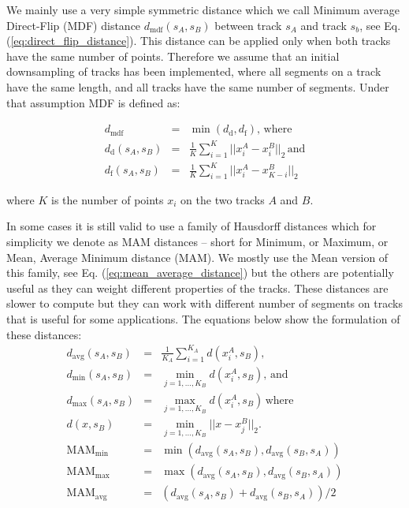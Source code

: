 \documentclass[preprint,authoryear,a4paper,10pt,onecolumn]{elsarticle}
\begin{document}
We mainly use a very simple symmetric distance \citep{EGMB10,
  Visser2010} which we call Minimum average Direct-Flip (MDF) distance
$d_{\textrm{mdf}}(s_{A},s_{B})$ between track $s_{A}$ and track $s_{b}$,
see Eq. (\ref{eq:direct_flip_distance}).  This distance can be applied
only when both tracks have the same number of points. Therefore we
assume that an initial downsampling of tracks has been implemented,
where all segments on a track have the same length, and all tracks have
the same number of segments. Under that assumption MDF is defined as:

\begin{eqnarray}
d_{\textrm{mdf}} & = & \min(d_{\textrm{d}},d_{\textrm{f}}),\,\textrm{where}\label{eq:direct_flip_distance}\\
d_{\textrm{d}}(s_{A},s_{B}) & = & \frac{1}{K}\sum_{i=1}^{K}||x_{i}^{A}-x_{i}^{B}||_{2}\,\textrm{and}\nonumber \\
d_{\textrm{f}}(s_{A},s_{B}) & = & \frac{1}{K}\sum_{i=1}^{K}||x_{i}^{A}-x_{K-i}^{B}||_{2}\nonumber \end{eqnarray}


where $K$ is the number of points $x_{i}$ on the two tracks $A$
and $B$.

In some cases it is still valid to use a family of Hausdorff distances
which for simplicity we denote as MAM distances -- short for Minimum,
or Maximum, or Mean, Average Minimum distance (MAM). We mostly use
the Mean version of this family, see Eq. (\ref{eq:mean_average_distance})
but the others are potentially useful as they can weight different
properties of the tracks. These distances are slower to compute but
they can work with different number of segments on tracks that is
useful for some applications. The equations below show the formulation
of these distances:\begin{eqnarray}
d_{\textrm{avg}}(s_{A},s_{B}) & = & \frac{1}{K_{A}}\sum_{i=1}^{K_{A}}d(x_{i}^{A},s_{B}),\nonumber \\
d_{\textrm{min}}(s_{A},s_{B}) & = & \min_{j=1,...,K_{B}}d(x_{i}^{A},s_{B}),\,\textrm{and}\label{eq:mininum_distance}\\
d_{\textrm{max}}(s_{A},s_{B}) & = & \max_{j=1,...,K_{B}}d(x_{i}^{A},s_{B})\,\textrm{where}\label{eq:maximum distance}\\
d(x,s_{B}) & = & \min_{j=1,...,K_{B}}||x-x_{j}^{B}||_{2}.\nonumber \\
\textrm{MAM}_{\textrm{min}} & = & \min(d_{\textrm{avg}}(s_{A},s_{B}),d_{\textrm{avg}}(s_{B},s_{A}))\label{eq:min_average_distance}\\
\textrm{MAM}_{\textrm{max}} & = & \max(d_{\textrm{avg}}(s_{A},s_{B}),d_{\textrm{avg}}(s_{B},s_{A}))\nonumber \\
\textrm{MAM}_{\textrm{avg}} & = & (d_{\textrm{avg}}(s_{A},s_{B})+d_{\textrm{avg}}(s_{B},s_{A}))/2\label{eq:mean_average_distance}\end{eqnarray}
\end{document}
